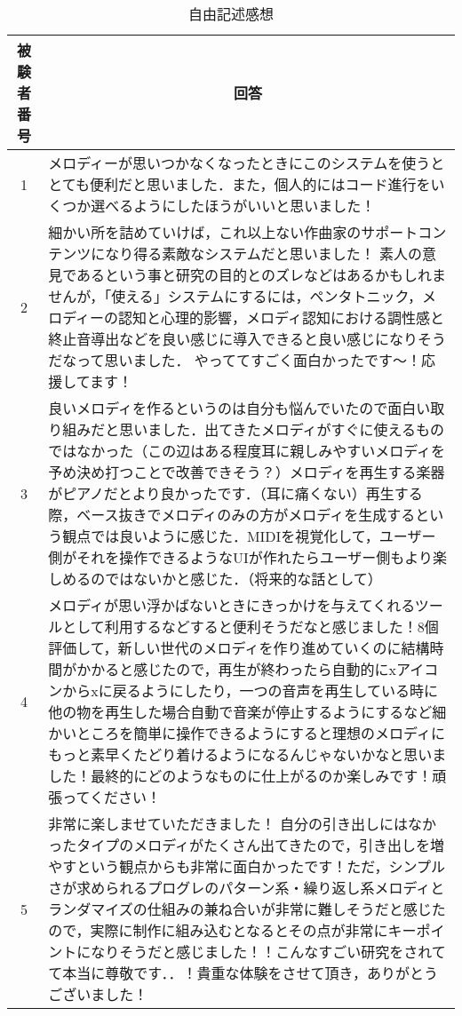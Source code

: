 \begin{table}[htbp]
  \begin{center}
    \caption{自由記述感想}
    \begin{tabular}{|c|p{35em}|}
      \hline
      被験者番号 & \multicolumn{1}{c|}{回答}\rule[-2mm]{-1.3mm}{6mm} \\ \hline \hline
      1 & メロディーが思いつかなくなったときにこのシステムを使うととても便利だと思いました．また，個人的にはコード進行をいくつか選べるようにしたほうがいいと思いました！ \\ \hline
      2 & 細かい所を詰めていけば，これ以上ない作曲家のサポートコンテンツになり得る素敵なシステムだと思いました！
      素人の意見であるという事と研究の目的とのズレなどはあるかもしれませんが，「使える」システムにするには，ペンタトニック，メロディーの認知と心理的影響，メロディ認知における調性感と終止音導出などを良い感じに導入できると良い感じになりそうだなって思いました．
      やっててすごく面白かったです～！応援してます！ \\ \hline
      3 & 良いメロディを作るというのは自分も悩んでいたので面白い取り組みだと思いました．出てきたメロディがすぐに使えるものではなかった（この辺はある程度耳に親しみやすいメロディを予め決め打つことで改善できそう？）メロディを再生する楽器がピアノだとより良かったです．（耳に痛くない）再生する際，ベース抜きでメロディのみの方がメロディを生成するという観点では良いように感じた．MIDIを視覚化して，ユーザー側がそれを操作できるようなUIが作れたらユーザー側もより楽しめるのではないかと感じた．（将来的な話として） \\ \hline
      4 & メロディが思い浮かばないときにきっかけを与えてくれるツールとして利用するなどすると便利そうだなと感じました！8個評価して，新しい世代のメロディを作り進めていくのに結構時間がかかると感じたので，再生が終わったら自動的にxアイコンからxに戻るようにしたり，一つの音声を再生している時に他の物を再生した場合自動で音楽が停止するようにするなど細かいところを簡単に操作できるようにすると理想のメロディにもっと素早くたどり着けるようになるんじゃないかなと思いました！最終的にどのようなものに仕上がるのか楽しみです！頑張ってください！ \\ \hline
      5 & 非常に楽しませていただきました！
      自分の引き出しにはなかったタイプのメロディがたくさん出てきたので，引き出しを増やすという観点からも非常に面白かったです！ただ，シンプルさが求められるプログレのパターン系・繰り返し系メロディとランダマイズの仕組みの兼ね合いが非常に難しそうだと感じたので，実際に制作に組み込むとなるとその点が非常にキーポイントになりそうだと感じました！！こんなすごい研究をされてて本当に尊敬です．．！貴重な体験をさせて頂き，ありがとうございました！ \\ \hline

\end{tabular}
\end{center}
\end{table}
